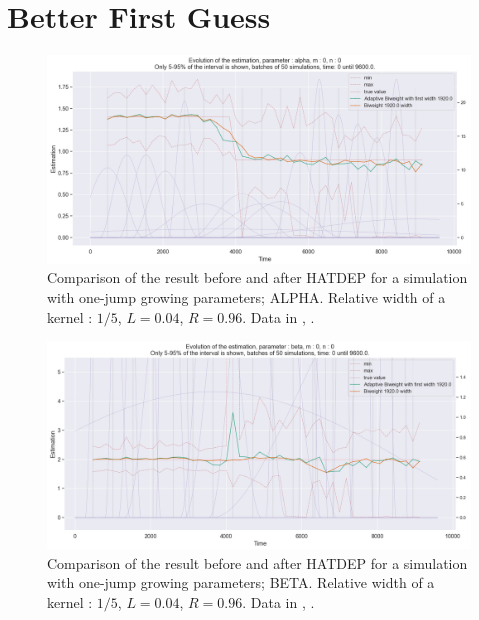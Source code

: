 \newpage
\section{Better First Guess}



\begin{figure}
\centering
\includegraphics[width = 0.90 \textwidth]{../imag/chap3/2_bis/P.png}
\caption{Comparison of the result before and after HATDEP for a simulation with one-jump growing parameters; ALPHA. Relative width of a kernel : $1/5$, $L = 0.04$, $R = 0.96$. Data in \protect {}, \protect {}.}
\label{fig:second_estimate_2_alpha}
\end{figure}

\begin{figure}
\centering
\includegraphics[width = 0.90 \textwidth]{../imag/chap3/2_bis/Q.png}
\caption{Comparison of the result before and after HATDEP for a simulation with one-jump growing parameters; BETA. Relative width of a kernel : $1/5$, $L = 0.04$, $R = 0.96$. Data in \protect {}, \protect {}.}
\label{fig:second_estimate_2_beta}
\end{figure}

